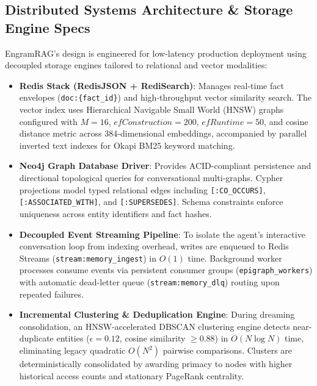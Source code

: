 \documentclass[conference]{IEEEtran}
\begin{document}
\subsection{Distributed Systems Architecture \& Storage Engine Specs}
\label{sec:distributed_storage}
EngramRAG's design is engineered for low-latency production deployment using decoupled storage engines tailored to relational and vector modalities:
\begin{itemize}
    \item \textbf{Redis Stack (RedisJSON + RediSearch)}: Manages real-time fact envelopes (\texttt{doc:\{fact\_id\}}) and high-throughput vector similarity search. The vector index uses Hierarchical Navigable Small World (HNSW) graphs \cite{malkov2018hnsw} configured with $M=16$, $efConstruction=200$, $efRuntime=50$, and cosine distance metric across 384-dimensional embeddings, accompanied by parallel inverted text indexes for Okapi BM25 keyword matching.
    \item \textbf{Neo4j Graph Database Driver}: Provides ACID-compliant persistence and directional topological queries for conversational multi-graphs. Cypher projections model typed relational edges including \texttt{[:CO\_OCCURS]}, \texttt{[:ASSOCIATED\_WITH]}, and \texttt{[:SUPERSEDES]}. Schema constraints enforce uniqueness across entity identifiers and fact hashes.
    \item \textbf{Decoupled Event Streaming Pipeline}: To isolate the agent's interactive conversation loop from indexing overhead, writes are enqueued to Redis Streams (\texttt{stream:memory\_ingest}) in $O(1)$ time. Background worker processes consume events via persistent consumer groups (\texttt{epigraph\_workers}) with automatic dead-letter queue (\texttt{stream:memory\_dlq}) routing upon repeated failures.
    \item \textbf{Incremental Clustering \& Deduplication Engine}: During dreaming consolidation, an HNSW-accelerated DBSCAN clustering engine \cite{ester1996density} detects near-duplicate entities ($\epsilon = 0.12$, cosine similarity $\ge 0.88$) in $O(N \log N)$ time, eliminating legacy quadratic $O(N^2)$ pairwise comparisons. Clusters are deterministically consolidated by awarding primacy to nodes with higher historical access counts and stationary PageRank centrality.
\end{itemize}
\end{document}
